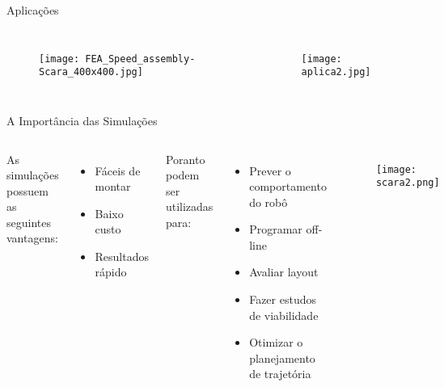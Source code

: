 \begin{frame}[c]{Aplicações}

    \begin{columns}
        \begin{figure}
            \texttt{[image: FEA\_Speed\_assembly-Scara\_400x400.jpg]}
        \end{figure}    

        \begin{figure}
            \texttt{[image: aplica2.jpg]}
        \end{figure}   
    
    \end{columns}
    
\end{frame}
\begin{frame}[c]{A Importância das Simulações} 
    \begin{columns}
        As simulações possuem as seguintes vantagens:
        \begin{itemize}
            \item Fáceis de montar
            \item Baixo custo
            \item Resultados rápido
        \end{itemize}
        Poranto podem ser utilizadas para:
        \begin{itemize}
        \item Prever o comportamento do robô
        \item Programar off-line
        \item Avaliar layout
        \item Fazer estudos de viabilidade
        \item Otimizar o planejamento de trajetória
        \end{itemize}
        \begin{figure}
            \texttt{[image: scara2.png]}
        \end{figure}   
    
    \end{columns}
    
\end{frame}
